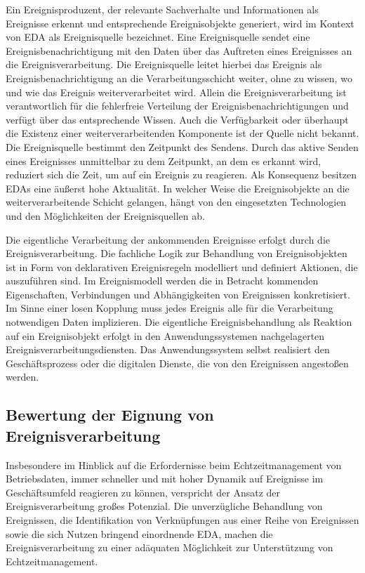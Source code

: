 Ein Ereignisproduzent, der relevante Sachverhalte und Informationen als Ereignisse erkennt und entsprechende Ereignisobjekte generiert, wird im Kontext von \ac{EDA} als Ereignisquelle bezeichnet.  
\cite{Bruns.2010}
Eine Ereignisquelle sendet eine Ereignisbenachrichtigung mit den Daten über das Auftreten eines Ereignisses an die Ereignisverarbeitung. 
Die Ereignisquelle leitet hierbei das Ereignis als Ereignisbenachrichtigung an die Verarbeitungsschicht weiter, ohne zu wissen, wo und wie das Ereignis weiterverarbeitet wird. 
Allein die Ereignisverarbeitung ist verantwortlich für die fehlerfreie Verteilung der Ereignisbenachrichtigungen und verfügt über das entsprechende Wissen. 
Auch die Verfügbarkeit oder überhaupt die Existenz einer weiterverarbeitenden Komponente ist der Quelle nicht bekannt. 
\cite{Bruns.2010}
Die Ereignisquelle bestimmt den Zeitpunkt des Sendens. 
Durch das aktive Senden eines Ereignisses unmittelbar zu dem Zeitpunkt, an dem es erkannt wird, reduziert sich die Zeit, um auf ein Ereignis zu reagieren. 
Als Konsequenz besitzen EDAs eine äußerst hohe Aktualität.
In welcher Weise die Ereignisobjekte an die weiterverarbeitende Schicht gelangen, hängt von den eingesetzten Technologien und den Möglichkeiten der Ereignisquellen ab.
\cite{Hedtstuck.2017}

Die eigentliche Verarbeitung der ankommenden Ereignisse erfolgt durch die Ereignisverarbeitung. 
Die fachliche Logik zur Behandlung von Ereignisobjekten ist in Form von deklarativen Ereignisregeln modelliert und definiert Aktionen, die auszuführen sind. 
Im Ereignismodell werden die in Betracht kommenden Eigenschaften, Verbindungen und Abhängigkeiten von Ereignissen konkretisiert. Im Sinne einer losen Kopplung muss jedes Ereignis alle für die Verarbeitung notwendigen Daten implizieren.
\cite{Bruns.2010}
Die eigentliche Ereignisbehandlung als Reaktion auf ein Ereignisobjekt erfolgt in den Anwendungssystemen nachgelagerten Ereignisverarbeitungsdiensten. 
Das Anwendungssystem selbst realisiert den Geschäftsprozess oder die digitalen Dienste, die von den Ereignissen angestoßen werden. 
\cite{Muhl.2006}

\subsection{Bewertung der Eignung von Ereignisverarbeitung}
Insbesondere im Hinblick auf die Erfordernisse beim Echtzeitmanagement von Betriebsdaten, immer schneller und mit hoher Dynamik auf Ereignisse im Geschäftsumfeld reagieren zu können, verspricht der Ansatz der Ereignisverarbeitung großes Potenzial.
Die unverzügliche Behandlung von Ereignissen, die Identifikation von Verknüpfungen aus einer Reihe von Ereignissen sowie die sich Nutzen bringend einordnende \ac{EDA}, machen die Ereignisverarbeitung zu einer adäquaten Möglichkeit zur Unterstützung von Echtzeitmanagement.
\cite{Vidackovic.2010} 

